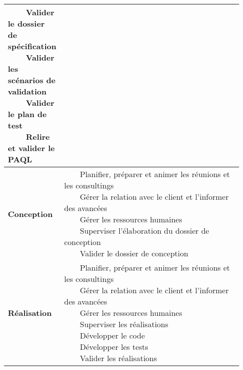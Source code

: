 \documentclass[a4paper,11pt,titlepage]{article}
\makeatletter
\newcommand{\tabitem}{~~\llap{\textbullet}~~}
\newcommand{\ti}[1]{\begin{tabular}[c]{@{}l@{}}#1\end{tabular}} %
\makeatother
\begin{document}
\begin{longtable}{|p{0.15\linewidth}|p{0.8\linewidth}|}
{    \tabitem Valider le dossier de spécification                                                 \\
    \tabitem Valider les scénarios de validation                                                 \\
    \tabitem Valider le plan de test                                                             \\
    \tabitem Relire et valider le PAQL                                                           \\
    }                                                                                            \\    \hline
    \textbf{Conception}                                & \ti{
    \tabitem Planifier, préparer et animer les réunions et les consultings                       \\
    \tabitem Gérer la relation avec le client et l'informer des avancées                         \\
    \tabitem Gérer les ressources humaines                                                       \\
    \tabitem Superviser l'élaboration du dossier de conception                                   \\
    \tabitem Valider le dossier de conception                                                    \\
    }                                                                                            \\ \hline
    \textbf{Réalisation}                               & \ti{
    \tabitem Planifier, préparer et animer les réunions et les consultings                       \\
    \tabitem Gérer la relation avec le client et l'informer des avancées                         \\
    \tabitem Gérer les ressources humaines                                                       \\
    \tabitem Superviser les réalisations                                                         \\
    \tabitem Développer le code                                                                  \\
    \tabitem Développer les tests                                                                \\
    \tabitem Valider les réalisations                                                            \\
}
\end{longtable}
\end{document}
